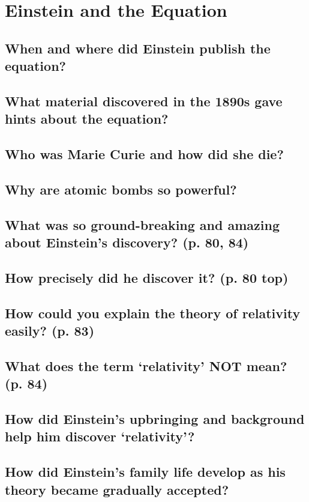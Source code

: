 %

\section{Einstein and the Equation}

\subsection*{When and where did Einstein publish the equation?}

\subsection*{What material discovered in the 1890s gave hints about the equation?}

\subsection*{Who was Marie Curie and how did she die?}

\subsection*{Why are atomic bombs so powerful?}

\subsection*{What was so ground-breaking and amazing about Einstein’s discovery? (p. 80, 84)}

\subsection*{How precisely did he discover it? (p. 80 top)}

\subsection*{How could you explain the theory of relativity easily? (p. 83)}

\subsection*{What does the term ‘relativity’ NOT mean? (p. 84)}

\subsection*{How did Einstein’s upbringing and background help him discover ‘relativity’?}

\subsection*{How did Einstein’s family life develop as his theory became gradually accepted?}